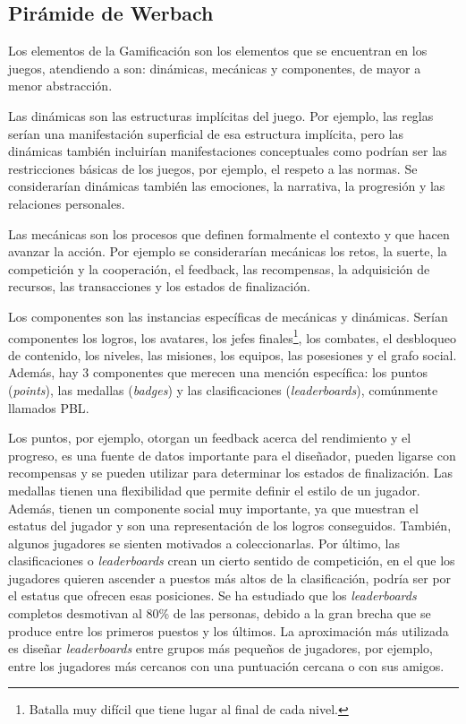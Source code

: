 \subsection{Pirámide de Werbach}

Los elementos de la Gamificación son los elementos que se encuentran en los juegos, atendiendo a  \cite{werbach2012win} son: dinámicas, mecánicas y componentes, de mayor a menor abstracción.

%
Las dinámicas son las estructuras implícitas del juego. 
%
Por ejemplo, las reglas serían una manifestación superficial de esa estructura implícita, pero las dinámicas también incluirían manifestaciones conceptuales como podrían ser las restricciones básicas de los juegos, por ejemplo, el respeto a las normas.
%
Se considerarían dinámicas también las emociones, la narrativa, la progresión y las relaciones personales.
%

 Las mecánicas son los procesos que definen formalmente el contexto y que hacen avanzar la acción. 
%
\label{mecanicas}
%
Por ejemplo se considerarían mecánicas los retos, la suerte, la competición y la cooperación, el feedback, las recompensas, la adquisición de recursos, las transacciones y los estados de finalización.


 Los componentes son las instancias específicas de mecánicas y dinámicas. 
%
Serían componentes los logros, los avatares, los jefes finales\footnote{Batalla muy difícil que tiene lugar al final de cada nivel.}, los combates, el desbloqueo de contenido, los niveles, las misiones, los equipos, las posesiones y el grafo social.
%
Además, hay 3 componentes que merecen una mención específica: los puntos (\textit{points}), las medallas (\textit{badges}) y las clasificaciones (\textit{leaderboards}), comúnmente llamados \gls{PBL}.

Los puntos, por ejemplo, otorgan un feedback acerca del rendimiento y el progreso, es una fuente de datos importante para el diseñador, pueden ligarse con recompensas y se pueden utilizar para determinar los estados de finalización.
%
Las medallas tienen una flexibilidad que permite definir el estilo de un jugador. 
%
Además, tienen un componente social muy importante, ya que muestran el estatus del jugador y son una representación de los logros conseguidos. 
%
También, algunos jugadores se sienten motivados a coleccionarlas.
%
Por último, las clasificaciones o \textit{leaderboards} crean un cierto sentido de competición, en el que los jugadores quieren ascender a puestos más altos de la clasificación, podría ser por el estatus que ofrecen esas posiciones.
%
Se ha estudiado que los \textit{leaderboards} completos desmotivan al 80\% de las personas, debido a la gran brecha que se produce entre los primeros puestos y los últimos.
%
La aproximación más utilizada es diseñar \textit{leaderboards} entre grupos más pequeños de jugadores, por ejemplo, entre los jugadores más cercanos con una puntuación cercana o con sus amigos.



